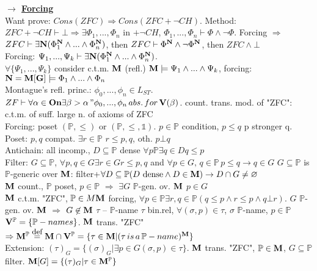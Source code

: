\documentclass[9pt]{article}
\newcommand{\class}[1]{{\bf #1}}
\newcommand{\Pp}{\mathbb{P}}
\newcommand{\eqdef}{\overset{\mbox{\small{def}}}{=}}
\newcommand{\mytitle}[1]{ {\bf $\rightarrow$ \underline{#1}}\\}
\newcommand{\On}{\class{On}}
\newcommand{\V}{\class{V}}
\begin{document}
\begin{multicols*}{2}
\mytitle{Forcing}
Want prove: $Cons(ZFC)\Rightarrow Cons(ZFC+\neg CH)$.
Method: $ZFC+\neg CH\vdash\bot\Rightarrow\exists \Phi_1,...,\Phi_n$ in $+\neg CH$, $\Phi_1,...,\Phi_n\vdash \Phi \wedge\neg\Phi$.
Forcing $\Rightarrow$ $ZFC\vdash\exists\class{N}(\Phi_1^\class{N}\wedge...\wedge\Phi_n^\class{N})$, then $ZFC\vdash \Phi^\class{N}\wedge\neg\Phi^\class{N}$, then $ZFC\wedge\bot$\\
Forcing: $\Psi_1,...,\Psi_k\vdash \exists\class{N}(\Phi_1^\class{N}\wedge...\wedge\Phi_n^\class{N})$.\\
$\forall \{\Psi_1,...,\Psi_k\}$ consider c.t.m. $\class{M}$ (refl.) $\class{M}\models \Psi_1\wedge...\wedge\Psi_k$, forcing: $\class{N}=\class{M}[\class{G}]\models\Phi_1\wedge...\wedge\Phi_n$\\

Montague's refl. princ.: $\phi_0,...,\phi_n\in L_{ST}$. $ZF\vdash \forall\alpha\in\On\exists\beta>\alpha \,"\phi_0,...,\phi_n\,abs.\,for\,\V(\beta)$. count. trans. mod. of "ZFC": c.t.m. of suff. large n. of axioms of ZFC\\
Forcing: poset $(\mathbb{P}, \leqslant)$ or $(\mathbb{P}, \leqslant,\mathbb{1})$. $p\in \Pp$ condition, $p\leqslant q$ p stronger q.\\
Poset: $p,q$ compat. $\exists r\in \Pp$ $r\leqslant p, q$, oth. $p\bot q$\\
Antichain: all incomp., $D\subseteq \Pp$ dense $\forall p\Pp\exists q\in D q\leqslant p$\\
Filter: $G\subseteq \Pp$, $\forall p, q\in G\exists r\in G r\leqslant p, q$ and $\forall p\in G,\,q\in \Pp\,p\leqslant q\rightarrow q\in G$
$G\subseteq \Pp$ is $\Pp$-generic over $\class{M}$: filter+$\forall D\subseteq \Pp (D\mbox{ dense}\wedge D\in\class{M})\rightarrow D\cap G\neq \varnothing$\\
$\class{M}$ count., $\Pp$ poset, $p\in \Pp$ $\Rightarrow$ $\exists G$ $\Pp$-gen. ov. $\class{M}$ $p\in G$\\
$\class{M}$ c.t.m. "ZFC", $\Pp\in M\class{M}$ forcing, $\forall p\in\Pp\exists r,q\in\Pp (q\leqslant p\wedge r\leqslant p\wedge q\bot r)$. $G$ $\Pp$-gen. ov. $\class{M}$ $\Rightarrow$ $G\not\in\class{M}$
$\tau$ -- $\Pp$-name $\tau$ bin.rel, $\forall (\sigma,p)\in\tau$, $\sigma$ $\Pp$-name, $p\in\Pp$\\
$\V^\Pp=\{\Pp-names\}$. $\class{M}$ trans. "ZFC" $\Rightarrow \class{M}^\Pp\eqdef \class{M}\cap\V^\Pp=\{\tau\in\class{M}|(\tau\,is\,a\,\Pp-name)^\class{M}\}$\\
Extension: $(\tau)_G=\{(\sigma)_G|\exists p\in G(\sigma,p)\in\tau\}$. $\class{M}$ trans. "ZFC", $\Pp\in\class{M}$, $G\subseteq \Pp$ filter. $\class{M}[G]=\{(\tau)_G|\tau\in\class{M}^\Pp\}$\\

\end{multicols*}
\end{document}
